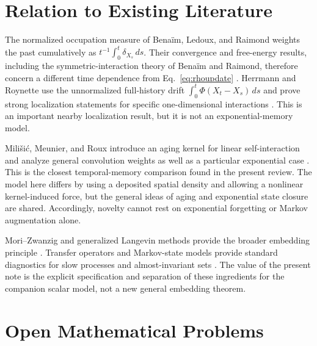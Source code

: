\documentclass[preprint,amsmath,amssymb,aps,prd,nofootinbib,floatfix]{revtex4-2}
\begin{document}
\section{Relation to Existing Literature}

The normalized occupation measure of Bena\"im, Ledoux, and Raimond weights the
past cumulatively as $t^{-1}\int_0^t\delta_{X_s}\,ds$.
Their convergence and free-energy results, including the symmetric-interaction
theory of Bena\"im and Raimond, therefore concern a different time dependence
from Eq.~\eqref{eq:rhoupdate}
\cite{BenAImRaimond2002,BenaimRaimond2005}.
Herrmann and Roynette use the unnormalized full-history drift
$\int_0^t\Phi(X_t-X_s)\,ds$ and prove strong localization statements for
specific one-dimensional interactions \cite{HerrmannRoynette2003}.
This is an important nearby localization result, but it is not an
exponential-memory model.

Mili\v{s}i\'c, Meunier, and Roux introduce an aging kernel for linear
self-interaction and analyze general convolution weights as well as a
particular exponential case \cite{MilisicMeunierRoux2026}.
This is the closest temporal-memory comparison found in the present review.
The model here differs by using a deposited spatial density and allowing a
nonlinear kernel-induced force, but the general ideas of aging and exponential
state closure are shared.
Accordingly, novelty cannot rest on exponential forgetting or Markov
augmentation alone.

Mori--Zwanzig and generalized Langevin methods provide the broader embedding
principle \cite{Mori1965,Zwanzig2001,JaganathanValani2025}.
Transfer operators and Markov-state models provide standard diagnostics for
slow processes and almost-invariant sets
\cite{NoeNuske2013,NoeWuPrinzPlattner2013,
WilliamsKevrekidisRowley2015,KlusEtAl2018}.
The value of the present note is the explicit specification and separation of
these ingredients for the companion scalar model, not a new general embedding
theorem.
\section{Open Mathematical Problems}
\end{document}
